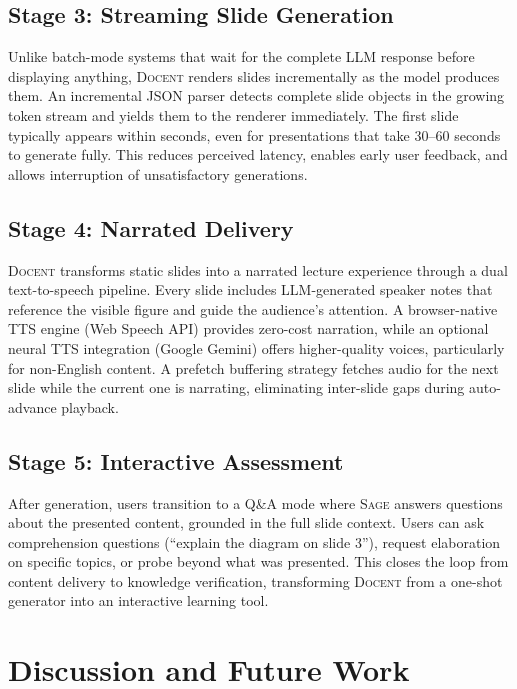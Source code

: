 \documentclass[11pt,a4paper]{article}
\newcommand{\system}{\textsc{Docent}\xspace}
\newcommand{\sage}{\textsc{Sage}\xspace}
\begin{document}
\subsection{Stage 3: Streaming Slide Generation}

Unlike batch-mode systems that wait for the complete LLM response before displaying anything, \system renders slides incrementally as the model produces them.
An incremental JSON parser detects complete slide objects in the growing token stream and yields them to the renderer immediately.
The first slide typically appears within seconds, even for presentations that take 30--60 seconds to generate fully.
This reduces perceived latency, enables early user feedback, and allows interruption of unsatisfactory generations.

\subsection{Stage 4: Narrated Delivery}

\system transforms static slides into a narrated lecture experience through a dual text-to-speech pipeline.
Every slide includes LLM-generated speaker notes that reference the visible figure and guide the audience's attention.
A browser-native TTS engine (Web Speech API) provides zero-cost narration, while an optional neural TTS integration (Google Gemini) offers higher-quality voices, particularly for non-English content.
A prefetch buffering strategy fetches audio for the next slide while the current one is narrating, eliminating inter-slide gaps during auto-advance playback.

\subsection{Stage 5: Interactive Assessment}

After generation, users transition to a Q\&A mode where \sage answers questions about the presented content, grounded in the full slide context.
Users can ask comprehension questions (``explain the diagram on slide 3''), request elaboration on specific topics, or probe beyond what was presented.
This closes the loop from content delivery to knowledge verification, transforming \system from a one-shot generator into an interactive learning tool.

\section{Discussion and Future Work}
\label{sec:future}
\end{document}
